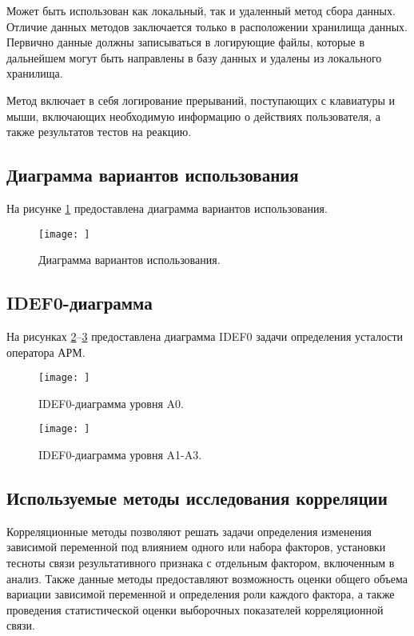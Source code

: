 Может быть использован как локальный, так и удаленный метод сбора данных. Отличие данных методов заключается только в расположении хранилища данных. Первично данные должны записываться в логирующие файлы, которые в дальнейшем могут быть направлены в базу данных и удалены из локального хранилища.

Метод включает в себя логирование прерываний, поступающих с клавиатуры и мыши, включающих необходимую информацию о действиях пользователя, а также результатов тестов на реакцию.

\subsection{Диаграмма вариантов использования}
На рисунке \ref{fig:useCase} предоставлена диаграмма вариантов использования.
\begin{figure}[H]
	\centering
	\texttt{[image: ]}
	\caption{Диаграмма вариантов использования.}
	\label{fig:useCase}
\end{figure}

\subsection{IDEF0-диаграмма}
На рисунках \ref{fig:idef:0}--\ref{fig:idef:1} предоставлена диаграмма IDEF0 задачи определения усталости оператора АРМ.

\begin{figure}[H]
	\centering
	\texttt{[image: ]}
	\caption{IDEF0-диаграмма уровня A0.}
	\label{fig:idef:0}
\end{figure}

\begin{figure}[H]
	\centering
	\texttt{[image: ]}
	\caption{IDEF0-диаграмма уровня A1-A3.}
	\label{fig:idef:1}
\end{figure}

\subsection{Используемые методы исследования корреляции}
Корреляционные методы позволяют решать задачи определения изменения зависимой переменной под влиянием одного или набора факторов, установки тесноты связи результативного признака с отдельным фактором, включенным в анализ. Также данные методы предоставляют возможность оценки общего объема вариации зависимой переменной и определения роли каждого фактора, а также проведения статистической оценки выборочных показателей корреляционной связи. \cite{correlInEco}

